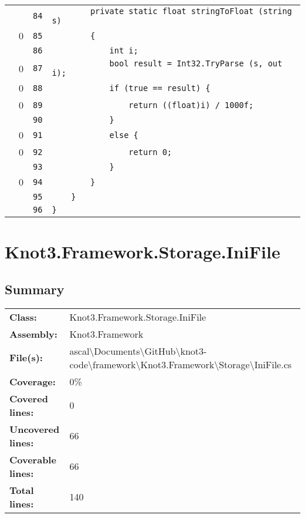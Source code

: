 \documentclass[a4paper,10pt]{article}
\begin{document}
\begin{longtable}[l]{lrrl}
\cellcolor{gray} &  & \verb~84~ & \verb~        private static float stringToFloat (string s)~\\
\cellcolor{red} & 0 & \verb~85~ & \verb~        {~\\
\cellcolor{gray} &  & \verb~86~ & \verb~            int i;~\\
\cellcolor{red} & 0 & \verb~87~ & \verb~            bool result = Int32.TryParse (s, out i);~\\
\cellcolor{red} & 0 & \verb~88~ & \verb~            if (true == result) {~\\
\cellcolor{red} & 0 & \verb~89~ & \verb~                return ((float)i) / 1000f;~\\
\cellcolor{gray} &  & \verb~90~ & \verb~            }~\\
\cellcolor{red} & 0 & \verb~91~ & \verb~            else {~\\
\cellcolor{red} & 0 & \verb~92~ & \verb~                return 0;~\\
\cellcolor{gray} &  & \verb~93~ & \verb~            }~\\
\cellcolor{red} & 0 & \verb~94~ & \verb~        }~\\
\cellcolor{gray} &  & \verb~95~ & \verb~    }~\\
\cellcolor{gray} &  & \verb~96~ & \verb~}~\\
\end{longtable}
\newpage
\section{Knot3.Framework.Storage.IniFile}
\subsection{Summary}
\begin{longtable}[l]{ll}
\textbf{Class:} & Knot3.Framework.Storage.IniFile\\
\textbf{Assembly:} & Knot3.Framework\\
\textbf{File(s):} & \begin{minipage}[t]{12cm}{ascal\textbackslash Documents\textbackslash GitHub\textbackslash knot3-code\textbackslash framework\textbackslash Knot3.Framework\textbackslash Storage\textbackslash IniFile.cs}\end{minipage} \\
\textbf{Coverage:} & 0\%\\
\textbf{Covered lines:} & 0\\
\textbf{Uncovered lines:} & 66\\
\textbf{Coverable lines:} & 66\\
\textbf{Total lines:} & 140\\
\end{longtable}
\end{document}
